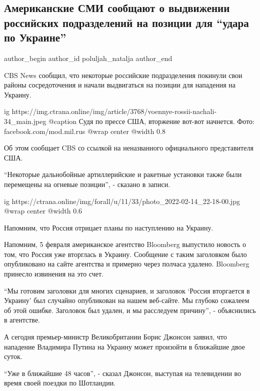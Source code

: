  
 
 
 
 
 
\subsection{Американские СМИ сообщают о выдвижении российских подразделений на позиции для \enquote{удара по Украине}}
\label{sec:14_02_2022.stz.news.ua.strana.2.rossia_armia_usa_smi_udar_po_ukraine}
 
\ifcmt
 author_begin
   author_id poluljah_natalja
 author_end
\fi

CBS News сообщил, что некоторые российские подразделения покинули свои районы
сосредоточения и начали выдвигаться на позиции для нападения на Украину.

\ifcmt
  ig https://img.ctrana.online/img/article/3768/voennye-rossii-nachali-34_main.jpeg
  @caption Судя по прессе США, вторжение вот-вот начнется. Фото: facebook.com/mod.mil.rus
  @wrap center
  @width 0.8
\fi

Об этом сообщает CBS со ссылкой на неназванного официального представителя США.

\enquote{Некоторые дальнобойные артиллерийские и ракетные установки также были
перемещены на огневые позиции}, - сказано в записи.

\ifcmt
  ig https://ctrana.online/img/forall/u/11/33/photo_2022-02-14_22-18-00.jpg
  @wrap center
  @width 0.6
\fi

Напомним, что Россия отрицает планы по наступлению на Украину.

Напомним, 5 февраля американское агентство Bloomberg выпустило новость о том,
что Россия уже вторглась в Украину. Сообщение с таким заголовком было
опубликовано на сайте агентства и примерно через полчаса удалено. Bloomberg
принесло извинения на это счет.

\enquote{Мы готовим заголовки для многих сценариев, и заголовок \enquote{Россия
вторгается в Украину} был случайно опубликован на нашем веб-сайте. Мы глубоко
сожалеем об этой ошибке. Заголовок был удален, и мы расследуем причину}, -
объяснились в агентстве.

А сегодня премьер-министр Великобритании Борис Джонсон заявил, что нападение
Владимира Путина на Украину может произойти в ближайшие двое суток.

\enquote{Уже в ближайшие 48 часов}, - сказал Джонсон, выступая на телевидении
во время своей поездки по Шотландии.
